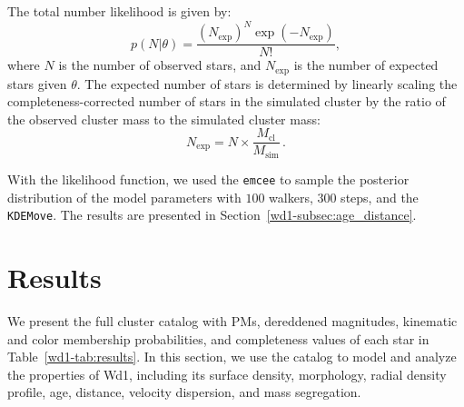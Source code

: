 \documentclass[12pt]{ucsddissertation}
\begin{document}
\begin{CJK*}{UTF8}{gbsn}
The total number likelihood is given by:
\begin{equation}
    p\left(N|\theta\right) = \frac{\left(N_\mathrm{exp}\right)^N \exp\left(-N_\mathrm{exp}\right)}{N!},
\end{equation}
where $N$ is the number of observed stars, and $N_\mathrm{exp}$ is the number of expected stars given $\theta$. The expected number of stars is determined by linearly scaling the completeness-corrected number of stars in the simulated cluster by the ratio of the observed cluster mass to the simulated cluster mass:
\begin{equation}
    N_\mathrm{exp} = N \times \frac{M_\mathrm{cl}}{M_\mathrm{sim}}\,.
\end{equation}

With the likelihood function, we used the \texttt{emcee} to sample the posterior distribution of the model parameters with $100$ walkers, $300$ steps, and the \texttt{KDEMove}. The results are presented in Section~\ref{wd1-subsec:age_distance}.


\section{Results}
\label{wd1-sec:results}
We present the full cluster catalog with PMs, dereddened magnitudes, kinematic and color membership probabilities, and completeness values of each star in Table~\ref{wd1-tab:results}. In this section, we use the catalog to model and analyze the properties of Wd1, including its surface density, morphology, radial density profile, age, distance, velocity dispersion, and mass segregation.



\end{CJK*}
\end{document}
